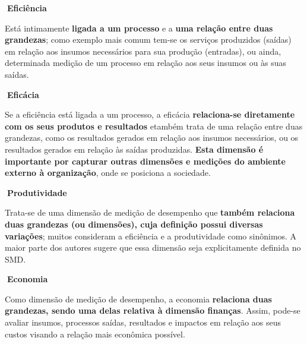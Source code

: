 \documentclass[
  letterpaper,
  DIV=11,
  numbers=noendperiod]{scrreprt}
\begin{document}
\begin{tcolorbox}[enhanced jigsaw, bottomrule=.15mm, arc=.35mm, breakable, toprule=.15mm, rightrule=.15mm, opacityback=0, left=2mm, colback=white, leftrule=.75mm]

\textbf{🔽{Eficiência}}\vspace{2mm}

Está intimamente \textbf{ligada a um processo} e a \textbf{uma relação
entre duas grandezas}; como exemplo mais comum tem-se os serviços
produzidos (saídas) em relação aos insumos necessários para sua produção
(entradas), ou ainda, determinada medição de um processo em relação aos
seus insumos ou às suas saídas.

\end{tcolorbox}

\begin{tcolorbox}[enhanced jigsaw, bottomrule=.15mm, arc=.35mm, breakable, toprule=.15mm, rightrule=.15mm, opacityback=0, left=2mm, colback=white, leftrule=.75mm]

\textbf{🔽{Eficácia}}\vspace{2mm}

Se a eficiência está ligada a um processo, a eficácia
\textbf{relaciona-se diretamente com os seus produtos e resultados}
etambém trata de uma relação entre duas grandezas, como os resultados
gerados em relação aos insumos necessários, ou os resultados gerados em
relação às saídas produzidas. \textbf{Esta dimensão é importante por
capturar outras dimensões e medições do ambiente externo à organização},
onde se posiciona a sociedade.

\end{tcolorbox}

\begin{tcolorbox}[enhanced jigsaw, bottomrule=.15mm, arc=.35mm, breakable, toprule=.15mm, rightrule=.15mm, opacityback=0, left=2mm, colback=white, leftrule=.75mm]

\textbf{🔽{Produtividade}}\vspace{2mm}

Trata-se de uma dimensão de medição de desempenho que \textbf{também
relaciona duas grandezas (ou dimensões), cuja definição possui diversas
variações}; muitos consideram a eficiência e a produtividade como
sinônimos. A maior parte dos autores sugere que essa dimensão seja
explicitamente definida no SMD.

\end{tcolorbox}

\begin{tcolorbox}[enhanced jigsaw, bottomrule=.15mm, arc=.35mm, breakable, toprule=.15mm, rightrule=.15mm, opacityback=0, left=2mm, colback=white, leftrule=.75mm]

\textbf{🔽{Economia}}\vspace{2mm}

Como dimensão de medição de desempenho, a economia \textbf{relaciona
duas grandezas, sendo uma delas relativa à dimensão finanças}. Assim,
pode-se avaliar insumos, processos saídas, resultados e impactos em
relação aos seus custos visando a relação mais econômica possível.

\end{tcolorbox}
\end{document}
